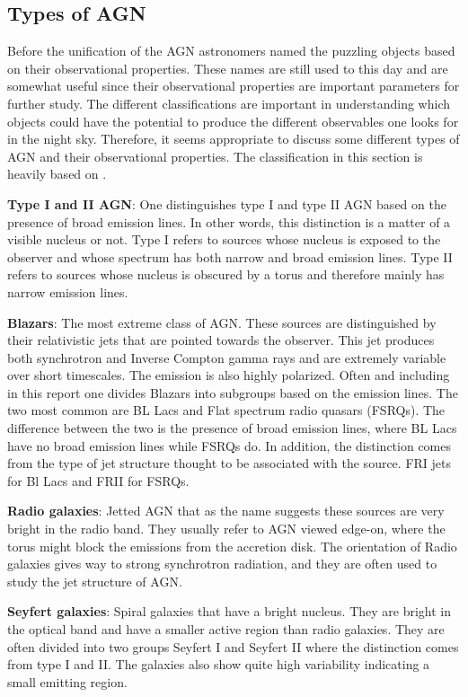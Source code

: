 \subsection{Types of AGN}

Before the unification of the AGN astronomers named the puzzling objects based on their observational properties. These 
names are still used to this day and are somewhat useful since their observational properties are important parameters for further study. 
The different classifications are important in understanding which objects could have the potential to produce the different observables one 
looks for in the night sky. Therefore, it seems appropriate to
discuss some different types of AGN and their observational properties. The classification in this section is heavily based on \cite{Astrobites}.

\textbf{Type I and II AGN}:
One distinguishes type I and type II AGN based on the presence of broad emission lines. In other words, this distinction is
a matter of a visible nucleus or not. Type I refers to sources whose nucleus is exposed to the observer and whose spectrum
has both narrow and broad emission lines. Type II refers to sources whose nucleus is obscured by a torus and therefore mainly has narrow emission lines.

\textbf{Blazars}:
The most extreme class of AGN. These sources are distinguished by their relativistic jets that are pointed towards the observer. 
This jet produces both synchrotron and Inverse Compton gamma rays and are extremely variable over short timescales. The
emission is also highly polarized. Often and including in this report one divides Blazars into subgroups based on the 
emission lines. The two most common are BL Lacs and Flat spectrum radio quasars (FSRQs). The difference between the two is the
presence of broad emission lines, where BL Lacs have no broad emission lines while FSRQs do. 
In addition, the distinction comes from the type of jet structure thought to be associated with the source. FRI jets for Bl Lacs and FRII for FSRQs. 

\textbf{Radio galaxies}:
Jetted AGN that as the name suggests these sources are very bright in the radio band. They usually refer to AGN viewed edge-on, where the
torus might block the emissions from the accretion disk. The orientation of Radio galaxies gives way to strong 
synchrotron radiation, and they are often used to study the jet structure of AGN.

\textbf{Seyfert galaxies}:
Spiral galaxies that have a bright nucleus. They are bright in the optical band and have a smaller active region 
than radio galaxies. They are often divided into two groups Seyfert I and Seyfert II where the distinction comes from type I and II. 
The galaxies also show quite high variability indicating a small emitting region. 

